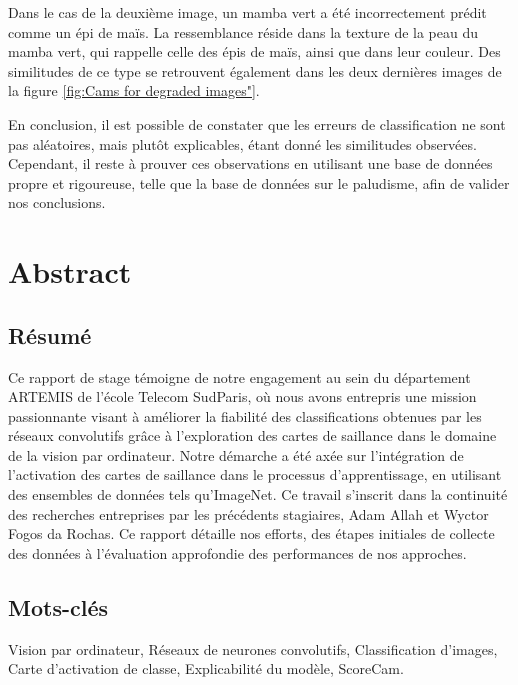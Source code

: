 \documentclass{report}
\begin{document}
{\hspace{1cm}Dans le cas de la deuxième image, un mamba vert a été incorrectement prédit comme un épi de maïs. La ressemblance réside dans la texture de la peau du mamba vert, qui rappelle celle des épis de maïs, ainsi que dans leur couleur. Des similitudes de ce type se retrouvent également dans les deux dernières images de la figure \ref{fig:Cams for degraded images"}.
\vspace*{1\baselineskip}

\hspace{1cm}En conclusion, il est possible de constater que les erreurs de classification ne sont pas aléatoires, mais plutôt explicables, étant donné les similitudes observées. Cependant, il reste à prouver ces observations en utilisant une base de données propre et rigoureuse, telle que la base de données sur le paludisme, afin de valider nos conclusions.







\chapter*{Abstract}
\section*{Résumé}
\hspace{1.6cm}Ce rapport de stage témoigne de notre engagement au sein du département ARTEMIS de l'école Telecom SudParis, où nous avons entrepris une mission passionnante visant à améliorer la fiabilité des classifications obtenues par les réseaux convolutifs grâce à l'exploration des cartes de saillance dans le domaine de la vision par ordinateur. Notre démarche a été axée sur l'intégration de l'activation des cartes de saillance dans le processus d'apprentissage, en utilisant des ensembles de données tels qu'ImageNet. Ce travail s'inscrit dans la continuité des recherches entreprises par les précédents stagiaires, Adam Allah et Wyctor Fogos da Rochas. Ce rapport détaille nos efforts, des étapes initiales de collecte des données à l'évaluation approfondie des performances de nos approches.

\section*{Mots-clés}
Vision par ordinateur, Réseaux de neurones convolutifs, Classification d'images, Carte d'activation de classe, Explicabilité du modèle, ScoreCam.


}
\end{document}
